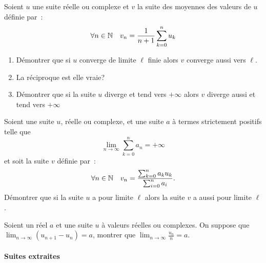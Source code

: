         \begin{exercice}
          Soient \(u\) une suite réelle ou complexe et \(v\) la suite des 
          moyennes des valeurs de \(u\) définie par~:
          \[ \forall n \in \mathbb{N} \quad v_n = \frac{1}{n+1}\sum_{k = 0}^n u_k \]
          \begin{enumerate}
            \item Démontrer que si \(u\) converge de limite \(\ell\) finie alors 
              \(v\) converge aussi vers \(\ell\).
            \item La réciproque est elle vraie?
            \item Démontrer que si la suite \(u\) diverge et tend vers 
              \(+\infty\) alors \(v\) diverge aussi et tend vers \(+\infty\)
          \end{enumerate}    \end{exercice}
          \begin{exercice}
            Soient une suite \(u\), réelle ou complexe, et une suite \(a\) à 
            termes strictement positifs telle que \[\lim_{n \to \infty} \sum_{k 
            = 0}^n a_n = +\infty\] et soit la suite \(v\) définie par~:
            \[\forall n \in \mathbb{N} \quad v_n = \frac{\sum_{k = 0}^n a_k u_k}{\sum_{i 
            = 0}^n a_i}.\]
            Démontrer que si la suite \(u\) a pour limite \(\ell\) alors la 
            suite \(v\) a aussi pour limite \(\ell\).
          \end{exercice}
          \begin{exercice}
            Soient un réel \(a\) et une suite \(u\) à valeurs réelles ou 
            complexes. On suppose que \(\lim_{n\to\infty} (u_{n+1}-u_n) = a\), 
            montrer que \(\lim_{n\to\infty} \frac{u_n}{n} = a\).
          \end{exercice}
          \paragraph{Suites extraites}
          ~~

